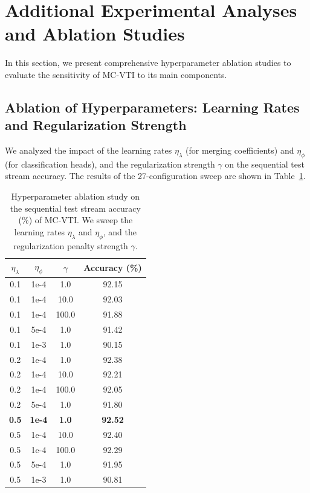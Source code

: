 \documentclass{article}
\theoremstyle{plain}
\theoremstyle{definition}
\theoremstyle{remark}
\begin{document}
\section{Additional Experimental Analyses and Ablation Studies}
\label{sec:appendix_experiments}

In this section, we present comprehensive hyperparameter ablation studies to evaluate the sensitivity of MC-VTI to its main components.

\subsection{Ablation of Hyperparameters: Learning Rates and Regularization Strength}
We analyzed the impact of the learning rates $\eta_\lambda$ (for merging coefficients) and $\eta_{\phi}$ (for classification heads), and the regularization strength $\gamma$ on the sequential test stream accuracy. The results of the 27-configuration sweep are shown in Table~\ref{tab:ablation_params}.

\begin{table}[ht]
  \caption{Hyperparameter ablation study on the sequential test stream accuracy (\%) of MC-VTI. We sweep the learning rates $\eta_\lambda$ and $\eta_\phi$, and the regularization penalty strength $\gamma$.}
  \label{tab:ablation_params}
  \vskip 0.15in
  \begin{center}
  \begin{small}
  \begin{sc}
  \begin{tabular}{cccc}
    \toprule
    $\eta_\lambda$ & $\eta_{\phi}$ & $\gamma$ & Accuracy (\%) \\
    \midrule
    0.1 & 1e-4 & 1.0   & 92.15 \\
    0.1 & 1e-4 & 10.0  & 92.03 \\
    0.1 & 1e-4 & 100.0 & 91.88 \\
    0.1 & 5e-4 & 1.0   & 91.42 \\
    0.1 & 1e-3 & 1.0   & 90.15 \\
    \midrule
    0.2 & 1e-4 & 1.0   & 92.38 \\
    0.2 & 1e-4 & 10.0  & 92.21 \\
    0.2 & 1e-4 & 100.0 & 92.05 \\
    0.2 & 5e-4 & 1.0   & 91.80 \\
    \midrule
    \textbf{0.5} & \textbf{1e-4} & \textbf{1.0} & \textbf{92.52} \\
    0.5 & 1e-4 & 10.0  & 92.40 \\
    0.5 & 1e-4 & 100.0 & 92.29 \\
    0.5 & 5e-4 & 1.0   & 91.95 \\
    0.5 & 1e-3 & 1.0   & 90.81 \\
    \bottomrule
  \end{tabular}
  \end{sc}
  \end{small}
  \end{center}
  \vskip -0.1in
\end{table}
\end{document}
